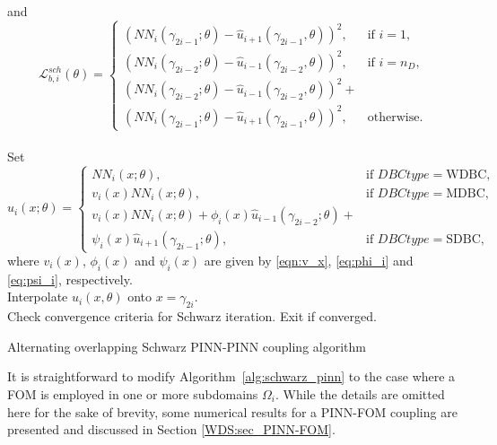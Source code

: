 \documentclass[oneside,final]{csri23}
\begin{document}
\begin{small}
\begin{algorithm}[h!]
\begin{small}
{{$$            $$
            and
            $$
            \mathcal{L}_{b,i}^{sch}(\theta)= \left\{ 
            \begin{array}{cl}
                \left( NN_i(\gamma_{2i-1}; \theta) - \hat{u}_{i+1}(\gamma_{2i-1}, \theta) \right)^2, & \text{if } i = 1, \\
                \left( NN_i(\gamma_{2i-2}; \theta) - \hat{u}_{i-1}(\gamma_{2i-2}, \theta) \right)^2, & \text{if } i = n_D, \\
                \left( NN_i(\gamma_{2i-2}; \theta) - \hat{u}_{i-1}(\gamma_{2i-2}, \theta) \right)^2 +\\ \left( NN_i(\gamma_{2i-1}; \theta) - \hat{u}_{i+1}(\gamma_{2i-1}, \theta) \right)^2, & \text{otherwise}.
            \end{array}\right.
            $$
            \\
            Set 
            $$
            \hat{u}_i(x;\theta) =  \left\{
            \begin{array}{cl}
                NN_i(x; \theta) , & \text{if }DBCtype = \text{WDBC}, \\
                v_i(x) NN_i(x; \theta), & \text{if } DBCtype = \text{MDBC}, \\ 
                v_i(x) NN_i(x; \theta) + \phi_i(x) \hat{u}_{i-1}(\gamma_{2i-2};\theta) + \\
                \psi_i(x) \hat{u}_{i+1}(\gamma_{2i-1}; \theta), & \text{if } DBCtype = \text{SDBC},
            \end{array}\right.
            $$
            where $v_i(x)$, $\phi_i(x)$ and $\psi_i(x)$ are given by \eqref{eqn:v_x}, \eqref{eq:phi_i} and \eqref{eq:psi_i}, respectively. \ 
            \\
            Interpolate $\hat{u}_i(x, \theta)$ onto $x = \gamma_{2i}$. \\
            Check convergence criteria for Schwarz iteration. Exit if converged.\\
        }
    }
    \caption{Alternating overlapping Schwarz PINN-PINN coupling algorithm}
    \label{alg:schwarz_pinn}
    \end{small}
\end{algorithm}
\end{small}

It is straightforward to modify Algorithm~\ref{alg:schwarz_pinn} to the case where a FOM is employed 
in one or more subdomains $\Omega_i$. While the details are omitted here for the sake of brevity, 
some numerical results for a PINN-FOM coupling are presented and discussed in Section \ref{WDS:sec_PINN-FOM}. 
\end{document}
